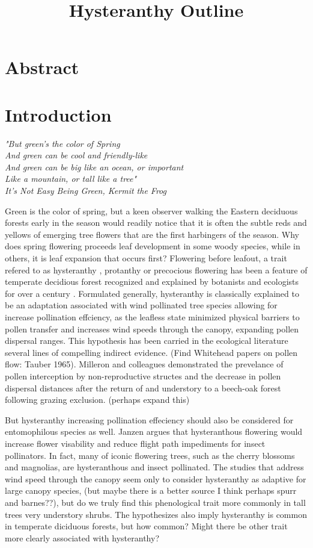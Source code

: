 \documentclass{article}\usepackage[]{graphicx}\usepackage[]{color}
\begin{document}
\title{Hysteranthy Outline}

\section{Abstract}
\section{Introduction}
\begin{framed}
\textit{
"But green's the color of Spring\\
And green can be cool and friendly-like\\
And green can be big like an ocean, or important\\
Like a mountain, or tall like a tree"\\
It's Not Easy Being Green, Kermit the Frog}
\end{framed}
\par
Green is the color of spring, but a keen observer walking the Eastern deciduous forests early in the season would readily notice that it is often the subtle reds and yellows of emerging tree flowers that are the first harbingers of the season. Why does spring flowering proceeds leaf development in some woody species, while in others, it is leaf expansion that occurs first? Flowering before leafout, a trait refered to as hysteranthy \citep{}, protanthy \citep{} or precocious flowering \citep{} has been a feature of temperate decidious forest recognized and explained by botanists and ecologists for over a century \citep{}. Formulated generally, hysteranthy is classically explained to be an adaptation associated with wind pollinated tree species allowing for increase pollination effciency\citep{}, as the leafless state minimized physical barriers to pollen transfer \citep{} and increases wind speeds through the canopy, expanding pollen dispersal ranges\citep{}. This hypothesis has been carried in the ecological literature several lines of compelling indirect evidence. (Find Whitehead papers on pollen flow: Tauber 1965). Milleron and colleagues \citeyear{} demonstrated the prevelance of pollen interception by non-reproductive structes and the decrease in pollen dispersal distances after the return of and understory to a beech-oak forest following grazing exclusion. (perhaps expand this)
\par
But hysteranthy increasing pollination effeciency should also be considered for entomophilous species as well. Janzen \citeyear{} argues that hysteranthous flowering would increase flower visability and reduce flight path impediments for insect pollinators. In fact, many of iconic flowering trees, such as the cherry blossoms and magnolias, are hysteranthous and insect pollinated. The studies that address wind speed through the canopy seem only to consider hysteranthy as adaptive for large canopy species, (but maybe there is a better source I think perhaps spurr and barnes??), but do we truly find this phenological trait more commonly in tall trees very understory shrubs. The hypothesizes also imply hysteranthy is common in temperate diciduous forests, but how common? Might there be other trait more clearly associated with hysteranthy?
\end{document}
